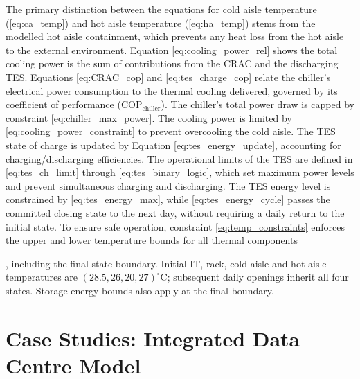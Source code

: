 \documentclass[lettersize,journal]{IEEEtran}
\providecommand{\DIFadd}[1]{{\color{blue}#1}}
\providecommand{\DIFaddbegin}{}
\providecommand{\DIFaddend}{}
\begin{document}
The primary distinction between the equation\DIFaddbegin \DIFadd{s}\DIFaddend{}  for cold aisle temperature (\ref{eq:ca_temp}) and hot aisle temperature (\ref{eq:ha_temp})  stems from the modelled hot aisle containment, which prevents any heat loss from the hot aisle to the external environment. Equation \eqref{eq:cooling_power_rel} shows the total cooling power is the sum of contributions from the CRAC and the discharging TES. Equations \eqref{eq:CRAC_cop} and \eqref{eq:tes_charge_cop} relate the chiller's electrical power consumption to the thermal cooling delivered, governed by its  \DIFaddbegin \DIFadd{coefficient of performance }\DIFaddend ($\mathrm{COP}_{\mathrm{chiller}}$). The chiller's total power draw is capped by constraint \eqref{eq:chiller_max_power}. The cooling power is limited by \eqref{eq:cooling_power_constraint} to prevent overcooling the cold aisle. The TES state of charge is updated by Equation \eqref{eq:tes_energy_update}, accounting for charging/discharging efficiencies. The operational limits of the TES are defined in  \DIFaddbegin \DIFadd{\eqref{eq:tes_ch_limit} }\DIFaddend through \eqref{eq:tes_binary_logic}, which set maximum power levels and prevent simultaneous charging and discharging. The TES energy level is constrained by \eqref{eq:tes_energy_max}, while \eqref{eq:tes_energy_cycle}  \DIFaddbegin \DIFadd{passes the committed closing state to the next day, without requiring a daily return to the }\DIFaddend initial state.
To ensure safe operation, constraint \eqref{eq:temp_constraints} enforces the upper and lower temperature bounds for all thermal components\DIFaddbegin \DIFadd{, including the final state boundary. Initial IT, rack, cold aisle and hot aisle temperatures are $(28.5,26,20,27)^\circ$C; subsequent daily openings inherit all four states. Storage energy bounds also apply at the final boundary.
 
}\DIFaddend 


\section{Case Studies: Integrated  \DIFaddbegin \DIFadd{Data Centre }\DIFaddend Model}\label{sec:integrated_model and case studies}
\end{document}

